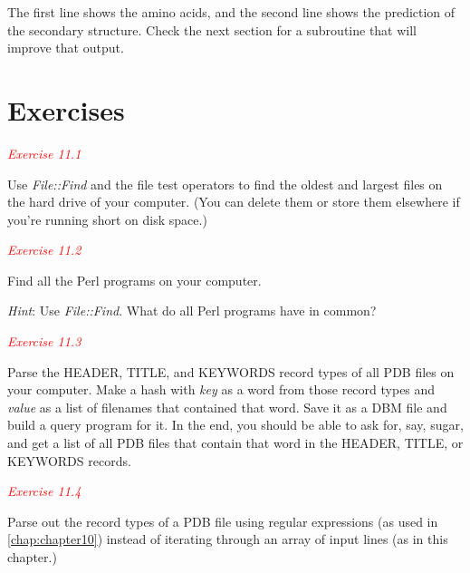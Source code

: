 The first line shows the amino acids, and the second line shows the prediction of the secondary structure. Check the next section for a subroutine that will improve that output. 


\textcolor{red}{\textit{}}
\begin{adjustwidth}{1cm}{}

\end{adjustwidth}


\textbf{}




\section{Exercises}
\textcolor{red}{\textit{Exercise 11.1}}
\begin{adjustwidth}{1cm}{}
Use \textit{File::Find} and the file test operators to find the oldest and largest files on the hard drive of your computer. (You can delete them or store them elsewhere if you're running short on disk space.)
\end{adjustwidth}

\textcolor{red}{\textit{Exercise 11.2}}
\begin{adjustwidth}{1cm}{}
Find all the Perl programs on your computer.

\textit{Hint}: Use \textit{File::Find}. What do all Perl programs have in common?
\end{adjustwidth}

\textcolor{red}{\textit{Exercise 11.3}}
\begin{adjustwidth}{1cm}{}
Parse the HEADER, TITLE, and KEYWORDS record types of all PDB files on your computer. Make a hash with \textit{key} as a word from those record types and \textit{value} as a list of filenames that contained that word. Save it as a DBM file and build a query program for it. In the end, you should be able to ask for, say, sugar, and get a list of all PDB files that contain that word in the HEADER, TITLE, or KEYWORDS records.
\end{adjustwidth}

\textcolor{red}{\textit{Exercise 11.4}}
\begin{adjustwidth}{1cm}{}
Parse out the record types of a PDB file using regular expressions (as used in \autoref{chap:chapter10}) instead of iterating through an array of input lines (as in this chapter.) 
\end{adjustwidth}

